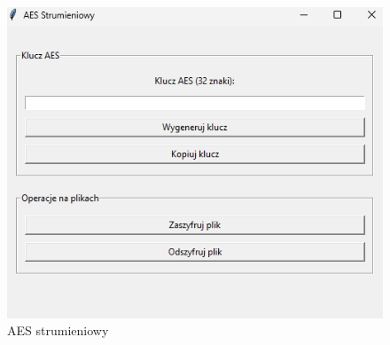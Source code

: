 \documentclass[12pt,a4paper]{article}
\begin{document}
\begin{figure}[!htb]
\begin{center}
\includegraphics[scale=0.45]{pictures/aesstrumieniowy.png}
\caption{AES strumieniowy}
\label{fig:AES strumieniowy}
\end{center}
\end{figure}

\newpage
\end{document}
